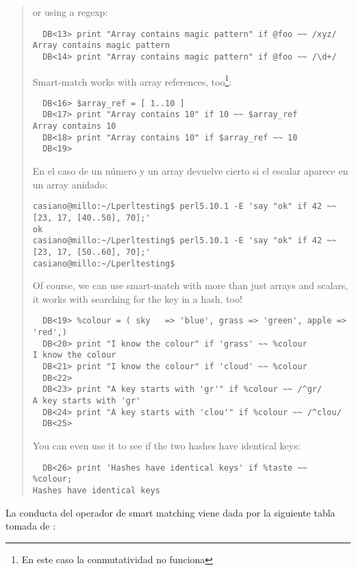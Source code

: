 \begin{it}
\begin{quotation}
or using a regexp:

\begin{verbatim}
  DB<13> print "Array contains magic pattern" if @foo ~~ /xyz/
Array contains magic pattern
  DB<14> print "Array contains magic pattern" if @foo ~~ /\d+/

\end{verbatim}

Smart-match works with array references, too\footnote{En este caso la conmutatividad no funciona}:

\begin{verbatim}
  DB<16> $array_ref = [ 1..10 ]
  DB<17> print "Array contains 10" if 10 ~~ $array_ref
Array contains 10
  DB<18> print "Array contains 10" if $array_ref ~~ 10
  DB<19>     
\end{verbatim}

En el caso de un número y un array devuelve cierto si el escalar aparece 
en un array anidado:

\begin{verbatim}
casiano@millo:~/Lperltesting$ perl5.10.1 -E 'say "ok" if 42 ~~  [23, 17, [40..50], 70];'
ok
casiano@millo:~/Lperltesting$ perl5.10.1 -E 'say "ok" if 42 ~~  [23, 17, [50..60], 70];'
casiano@millo:~/Lperltesting$                                                           
\end{verbatim}

Of course, we can use smart-match with more than just arrays and scalars,
it works with searching for the key in a hash, too!

\begin{verbatim}
  DB<19> %colour = ( sky   => 'blue', grass => 'green', apple => 'red',)
  DB<20> print "I know the colour" if 'grass' ~~ %colour
I know the colour
  DB<21> print "I know the colour" if 'cloud' ~~ %colour
  DB<22>
  DB<23> print "A key starts with 'gr'" if %colour ~~ /^gr/
A key starts with 'gr'
  DB<24> print "A key starts with 'clou'" if %colour ~~ /^clou/
  DB<25>
\end{verbatim}

You can even use it to see if the two hashes have identical keys:

\begin{verbatim}
  DB<26> print 'Hashes have identical keys' if %taste ~~ %colour;
Hashes have identical keys
\end{verbatim}
\end{quotation}
\end{it}

La conducta del operador de smart matching viene dada por la siguiente
tabla tomada de :

